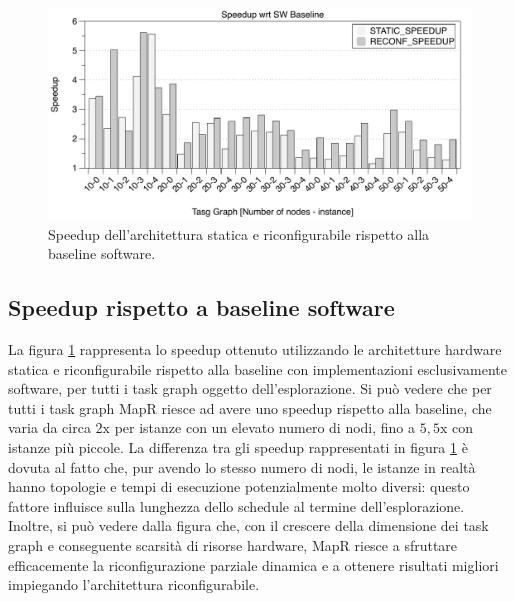 \begin{figure}[t]
 \begin{center}
  \includegraphics[width=\textwidth]{./capitoli/figure/cap6/FPL_makespan.pdf}
  \caption{Speedup dell'architettura statica e riconfigurabile rispetto alla
  baseline software.}
  \label{fig:speedupBaseline}
 \end{center}
\end{figure}

\subsection{Speedup rispetto a baseline software}
La figura \ref{fig:speedupBaseline} rappresenta lo speedup ottenuto utilizzando
le architetture hardware statica e riconfigurabile rispetto alla baseline
con implementazioni esclusivamente software, per tutti i task graph oggetto
dell'esplorazione. Si pu\`o vedere che per tutti i task graph MapR riesce ad
avere uno speedup rispetto alla baseline, che varia da circa $2\text{x}$ per istanze con
un elevato numero di nodi, fino a $5,5\text{x}$ con istanze pi\`u piccole. La differenza
tra gli speedup rappresentati in figura \ref{fig:speedupBaseline} \`e dovuta al fatto che,
pur avendo lo stesso numero di nodi, le istanze in realt\`a hanno topologie e tempi di
esecuzione potenzialmente molto diversi: questo fattore influisce sulla lunghezza dello schedule
al termine dell'esplorazione.
Inoltre, si pu\`o vedere dalla figura che, con il crescere della dimensione dei task graph e
conseguente scarsit\`a di risorse hardware, MapR riesce a sfruttare efficacemente la riconfigurazione
parziale dinamica e a ottenere risultati migliori impiegando l'architettura riconfigurabile.

